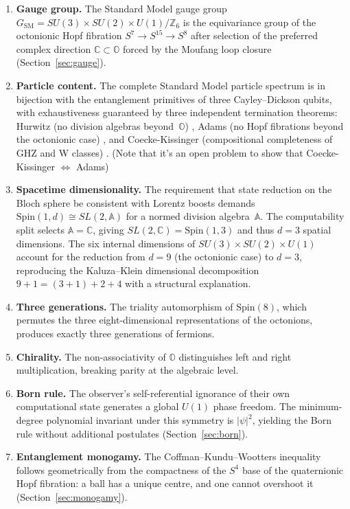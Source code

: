 \documentclass{article}
\begin{document}
\begin{enumerate}
  \item \textbf{Gauge group.} The Standard Model gauge group $G_{\mathrm{SM}} = SU(3) \times SU(2) \times U(1)/\mathbb{Z}_6$ is the equivariance group of the octonionic Hopf fibration $S^7 \to S^{15} \to S^8$ after selection of the preferred complex direction $\mathbb{C} \subset \mathbb{O}$ forced by the Moufang loop closure (Section~\ref{sec:gauge}).

  \item \textbf{Particle content.} The complete Standard Model particle spectrum is in bijection with the entanglement primitives of three Cayley--Dickson qubits, with exhaustiveness guaranteed by three independent termination theorems: Hurwitz (no division algebras beyond~$\mathbb{O}$) \autocite{hurwitz_1898}, Adams (no Hopf fibrations beyond the octonionic case) \autocite{adams_1960}, and Coecke-Kissinger (compositional completeness of GHZ and W classes) \autocite{Coecke2010TheEntanglement}. (Note that it's an open problem to show that Coecke-Kissinger $\iff$ Adams)

  \item \textbf{Spacetime dimensionality.} The requirement that state reduction on the Bloch sphere be consistent with Lorentz boosts demands $\mathrm{Spin}(1,d) \cong SL(2,\mathbb{A})$ for a normed division algebra~$\mathbb{A}$. The computability split selects $\mathbb{A} = \mathbb{C}$, giving $SL(2,\mathbb{C}) = \mathrm{Spin}(1,3)$ and thus $d = 3$ spatial dimensions. The six internal dimensions of $SU(3) \times SU(2) \times U(1)$ account for the reduction from $d = 9$ (the octonionic case) to $d = 3$, reproducing the Kaluza--Klein dimensional decomposition $9+1 = (3+1) + 2 + 4$ with a structural explanation.

  \item \textbf{Three generations.} The triality automorphism of $\mathrm{Spin}(8)$, which permutes the three eight-dimensional representations of the octonions, produces exactly three generations of fermions.

  \item \textbf{Chirality.} The non-associativity of $\mathbb{O}$ distinguishes left and right multiplication, breaking parity at the algebraic level.

  \item \textbf{Born rule.} The observer's self-referential ignorance of their own computational state generates a global $U(1)$ phase freedom. The minimum-degree polynomial invariant under this symmetry is $|\psi|^2$, yielding the Born rule without additional postulates (Section~\ref{sec:born}).

  \item \textbf{Entanglement monogamy.} The Coffman--Kundu--Wootters inequality follows geometrically from the compactness of the $S^4$ base of the quaternionic Hopf fibration: a ball has a unique centre, and one cannot overshoot it (Section~\ref{sec:monogamy}).
\end{enumerate}
\end{document}

